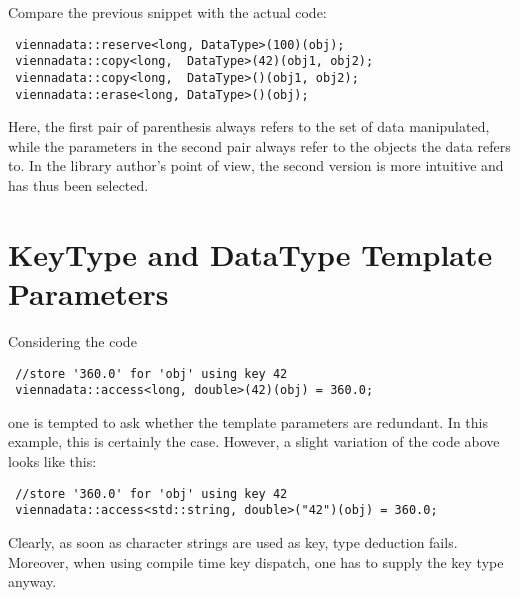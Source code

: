 Compare the previous snippet with the actual code:
\begin{lstlisting}
 viennadata::reserve<long, DataType>(100)(obj);
 viennadata::copy<long,  DataType>(42)(obj1, obj2);
 viennadata::copy<long,  DataType>()(obj1, obj2);
 viennadata::erase<long, DataType>()(obj);
\end{lstlisting}
Here, the first pair of parenthesis always refers to the set of data manipulated, while the parameters in the second pair always refer to the objects the data refers to.
In the library author's point of view, the second version is more intuitive and has thus been selected.


\section{KeyType and DataType Template Parameters}
Considering the code
\begin{lstlisting}
 //store '360.0' for 'obj' using key 42
 viennadata::access<long, double>(42)(obj) = 360.0;
\end{lstlisting}
one is tempted to ask whether the template parameters are redundant.
In this example, this is certainly the case. However, a slight variation of the code above looks like this:
\begin{lstlisting}
 //store '360.0' for 'obj' using key 42
 viennadata::access<std::string, double>("42")(obj) = 360.0;
\end{lstlisting}
Clearly, as soon as character strings are used as key, type deduction fails. Moreover, when using compile time key dispatch, one has to supply the
key type anyway.

